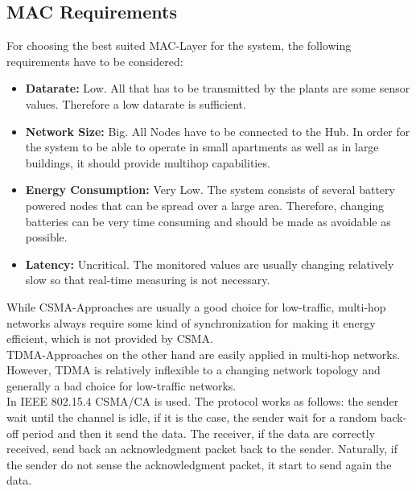 
\subsection{MAC Requirements}
For choosing the best suited MAC-Layer for the system, the following requirements have to be considered:

\begin{itemize}
	\item \textbf{Datarate:}
	Low. All that has to be transmitted by the plants are some sensor values. Therefore a low datarate is sufficient.
	\item \textbf{Network Size:}
	Big. All Nodes have to be connected to the Hub. In order for the system to be able to operate in small apartments as well as in large buildings, it should provide multihop capabilities.
	\item \textbf{Energy Consumption:}
	Very Low. The system consists of several battery powered nodes that can be spread over a large area. Therefore, changing batteries can be very time consuming and should be made as avoidable as possible.
	\item \textbf{Latency:}
	Uncritical. The monitored values are usually changing relatively slow so that real-time measuring is not necessary.
\end{itemize}

While CSMA-Approaches are usually a good choice for low-traffic, multi-hop networks always require some kind of synchronization for making it energy efficient, which is not provided by CSMA.\\
TDMA-Approaches on the other hand are easily applied in multi-hop networks. However, TDMA is relatively inflexible to a changing network topology and generally a bad choice for low-traffic networks.\\
In IEEE 802.15.4 CSMA/CA is used. The protocol works as follows:
the sender wait until the channel is idle, if it is the case, the sender wait for a random back-off period and then it send the data. The receiver, if the data are correctly received, send back an acknowledgment packet back to the sender. Naturally, if the sender do not sense the acknowledgment packet, it start to send again the data.\cite{slide}\\

